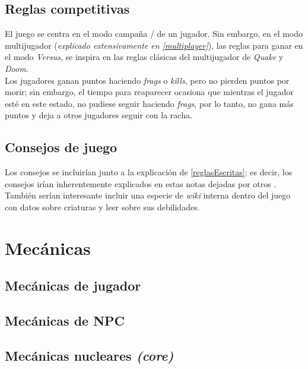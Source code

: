     \subsection{Reglas competitivas}
        El juego se centra en el modo campaña / de un jugador. Sin embargo, en el modo multijugador (\textit{explicado extensivamente en \ref{multiplayer}}), las reglas para ganar en el modo \textit{Versus}, se inspira en las reglas clásicas del multijugador de \textit{Quake} y \textit{Doom}.\\
        Los jugadores ganan puntos haciendo \textit{frags} o \textit{kills}, pero no pierden puntos por morir; sin embargo, el tiempo para reaparecer ocasiona que mientras el jugador esté en este estado, no pudiese seguir haciendo \textit{frags}, por lo tanto, no gana más puntos y deja a otros jugadores seguir con la racha.
    \subsection{Consejos de juego}
        Los consejos se incluirían junto a la explicación de \ref{reglasEscritas}; es decir, los consejos irían inherentemente explicados en estas notas dejadas por otros \hunters. También serían interesante incluir una especie de \textit{wiki} interna dentro del juego con datos sobre criaturas y leer sobre sus debilidades.

\section{Mecánicas}
    \subsection{Mecánicas de jugador}
    \subsection{Mecánicas de NPC}
    \subsection{Mecánicas nucleares \textit{(core)}}

